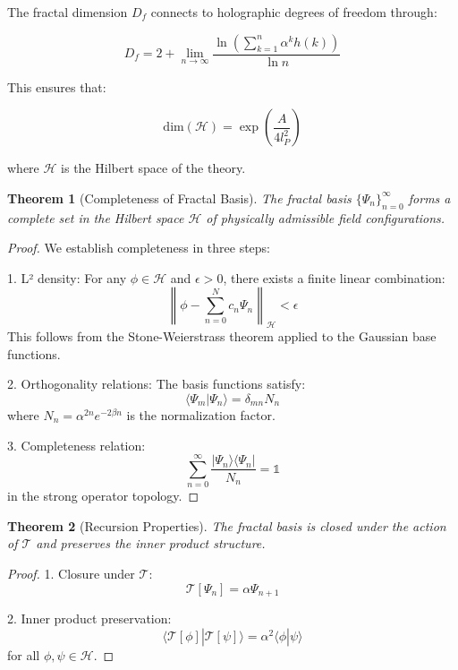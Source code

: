 \documentclass[12pt]{article}
\newtheorem{theorem}{Theorem}[section]
\begin{document}
The fractal dimension $D_f$ connects to holographic degrees of freedom through:

\begin{equation}
D_f = 2 + \lim_{n \to \infty} \frac{\ln\left(\sum_{k=1}^n \alpha^k h(k)\right)}{\ln n}
\end{equation}

This ensures that:

\begin{equation}
\text{dim}(\mathcal{H}) = \exp\left(\frac{A}{4l_P^2}\right)
\end{equation}

where $\mathcal{H}$ is the Hilbert space of the theory.

\begin{theorem}[Completeness of Fractal Basis]
The fractal basis $\{\Psi_n\}_{n=0}^{\infty}$ forms a complete set in the Hilbert space $\mathcal{H}$ of physically admissible field configurations.
\end{theorem}

\begin{proof}
We establish completeness in three steps:

1. L² density:
   For any $\phi \in \mathcal{H}$ and $\epsilon > 0$, there exists a finite linear combination:
   \[
   \left\|\phi - \sum_{n=0}^N c_n\Psi_n\right\|_{\mathcal{H}} < \epsilon
   \]
   This follows from the Stone-Weierstrass theorem applied to the Gaussian base functions.

2. Orthogonality relations:
   The basis functions satisfy:
   \[
   \langle\Psi_m|\Psi_n\rangle = \delta_{mn}N_n
   \]
   where $N_n = \alpha^{2n}e^{-2\beta n}$ is the normalization factor.

3. Completeness relation:
   \[
   \sum_{n=0}^{\infty} \frac{|\Psi_n\rangle\langle\Psi_n|}{N_n} = \mathbb{1}
   \]
   in the strong operator topology.
\end{proof}

\begin{theorem}[Recursion Properties]
The fractal basis is closed under the action of $\mathcal{T}$ and preserves the inner product structure.
\end{theorem}

\begin{proof}
1. Closure under $\mathcal{T}$:
   \[
   \mathcal{T}[\Psi_n] = \alpha\Psi_{n+1}
   \]
   
2. Inner product preservation:
   \[
   \langle\mathcal{T}[\phi]|\mathcal{T}[\psi]\rangle = \alpha^2\langle\phi|\psi\rangle
   \]
   for all $\phi,\psi \in \mathcal{H}$.
\end{proof}
\end{document}
